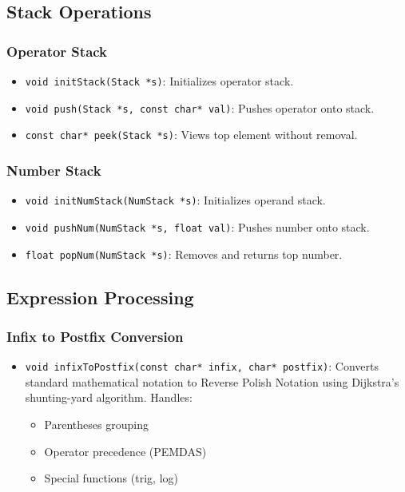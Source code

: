 \documentclass[journal]{IEEEtran}
\begin{document}
\subsection{Stack Operations}

\subsubsection{Operator Stack}
\begin{itemize}
\item \texttt{void initStack(Stack *s)}: Initializes operator stack.
\item \texttt{void push(Stack *s, const char* val)}: Pushes operator onto stack.
\item \texttt{const char* peek(Stack *s)}: Views top element without removal.
\end{itemize}

\subsubsection{Number Stack}
\begin{itemize}
\item \texttt{void initNumStack(NumStack *s)}: Initializes operand stack.
\item \texttt{void pushNum(NumStack *s, float val)}: Pushes number onto stack.
\item \texttt{float popNum(NumStack *s)}: Removes and returns top number.
\end{itemize}

\subsection{Expression Processing}

\subsubsection{Infix to Postfix Conversion}
\begin{itemize}
\item \texttt{void infixToPostfix(const char* infix, char* postfix)}:
Converts standard mathematical notation to Reverse Polish Notation using Dijkstra's shunting-yard algorithm. Handles:
\begin{itemize}
\item Parentheses grouping
\item Operator precedence (PEMDAS)
\item Special functions (trig, log)
\end{itemize}
\end{itemize}
\end{document}
